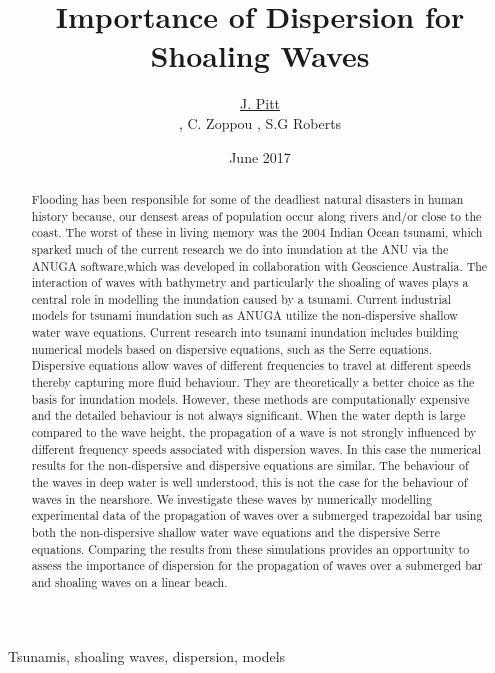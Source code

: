 \documentclass[a4paper,fleqn]{article} %
\begin{document}

\title{Importance of Dispersion for Shoaling Waves}
\author{\underline{J. Pitt} \address[ANU]{\it{Mathematical Sciences Institute, Australian National University, Canberra, ACT 0200, Australia}}, C. Zoppou \addressmark[ANU], S.G Roberts \addressmark[ANU]}



\date{June 2017}

\begin{keyword}
	Tsunamis, shoaling waves, dispersion, models

\end{keyword}

\begin{abstract}
	Flooding has been responsible for some of the deadliest natural disasters in human history because, our densest areas of population occur along rivers and/or close to the coast. The worst of these in living memory was the 2004 Indian Ocean tsunami, which sparked much of the current research we do into inundation at the ANU via the ANUGA software,which was developed in collaboration with Geoscience Australia. The interaction of waves with bathymetry and particularly the shoaling of waves plays a central role in modelling the inundation caused by a tsunami. Current industrial models for tsunami inundation such as ANUGA utilize the non-dispersive shallow water wave equations. Current research into tsunami inundation includes building numerical models based on dispersive equations, such as the Serre equations. Dispersive equations allow waves of different frequencies to travel at different speeds thereby capturing
	more fluid behaviour. They are theoretically a better choice as the basis for inundation models. However, these methods are computationally expensive and the detailed behaviour is not always significant. When the water depth is large compared to the wave height, the propagation of a wave is not strongly
	influenced by different frequency speeds associated with dispersion waves. In this case the numerical results for the non-dispersive and dispersive equations are similar. The behaviour of the waves in deep water is well understood, this is not the case for the behaviour of waves in the nearshore. We investigate these waves by numerically modelling experimental data of the propagation of waves over a submerged trapezoidal bar using both the non-dispersive 
	shallow water wave equations and the dispersive Serre equations. Comparing the results from these simulations provides an opportunity to assess the importance of dispersion for the propagation of waves over a submerged bar and shoaling waves on a linear beach.

\end{abstract} %
\end{document}
